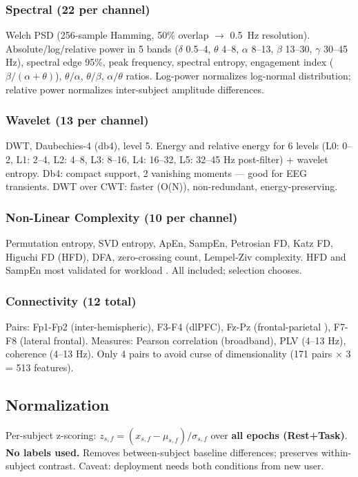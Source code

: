 \documentclass[conference]{IEEEtran}
\begin{document}
\subsubsection{Spectral (22 per channel)}
Welch PSD (256-sample Hamming, 50\% overlap $\rightarrow$ \SI{0.5}{\hertz} resolution). Absolute/log/relative power in 5 bands ($\delta$ 0.5--4, $\theta$ 4--8, $\alpha$ 8--13, $\beta$ 13--30, $\gamma$ 30--45 Hz), spectral edge 95\%, peak frequency, spectral entropy, engagement index ($\beta/(\alpha+\theta)$), $\theta/\alpha$, $\theta/\beta$, $\alpha/\theta$ ratios. Log-power normalizes log-normal distribution; relative power normalizes inter-subject amplitude differences.

\subsubsection{Wavelet (13 per channel)}
DWT, Daubechies-4 (db4), level 5. Energy and relative energy for 6 levels (L0: 0--2, L1: 2--4, L2: 4--8, L3: 8--16, L4: 16--32, L5: 32--45 Hz post-filter) + wavelet entropy. Db4: compact support, 2 vanishing moments — good for EEG transients. DWT over CWT: faster (O(N)), non-redundant, energy-preserving.

\subsubsection{Non-Linear Complexity (10 per channel)}
Permutation entropy, SVD entropy, ApEn, SampEn, Petrosian FD, Katz FD, Higuchi FD (HFD), DFA, zero-crossing count, Lempel-Ziv complexity. HFD and SampEn most validated for workload \cite{chikhi2022eeg}. All included; selection chooses.

\subsubsection{Connectivity (12 total)}
Pairs: Fp1-Fp2 (inter-hemispheric), F3-F4 (dlPFC), Fz-Pz (frontal-parietal \cite{dimitriadis2016causal}), F7-F8 (lateral frontal). Measures: Pearson correlation (broadband), PLV \cite{lachaux1999measuring} (4--13 Hz), coherence (4--13 Hz). Only 4 pairs to avoid curse of dimensionality (171 pairs $\times$ 3 = 513 features).

\subsection{Normalization}
\label{sec:normalize}
Per-subject z-scoring: $z_{s,f} = (x_{s,f} - \mu_{s,f})/\sigma_{s,f}$ over \textbf{all epochs (Rest+Task)}. \textbf{No labels used.} Removes between-subject baseline differences; preserves within-subject contrast. Caveat: deployment needs both conditions from new user.
\end{document}
